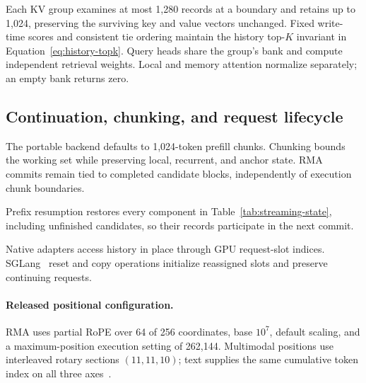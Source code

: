 Each KV group examines at most 1,280 records at a boundary and retains up to 1,024, preserving the surviving key and value vectors unchanged. Fixed write-time scores and consistent tie ordering maintain the history top-$K$ invariant in Equation~\ref{eq:history-topk}. Query heads share the group's bank and compute independent retrieval weights. Local and memory attention normalize separately; an empty bank returns zero.

\subsection{Continuation, chunking, and request lifecycle}

The portable backend defaults to 1,024-token prefill chunks. Chunking bounds the working set while preserving local, recurrent, and anchor state. RMA commits remain tied to completed candidate blocks, independently of execution chunk boundaries.

Prefix resumption restores every component in Table~\ref{tab:streaming-state}, including unfinished candidates, so their records participate in the next commit.

Native adapters access history in place through GPU request-slot indices. SGLang~\cite{sglang} reset and copy operations initialize reassigned slots and preserve continuing requests.


\paragraph{Released positional configuration.}
RMA uses partial RoPE over 64 of 256 coordinates, base $10^7$, default scaling, and a maximum-position execution setting of 262,144. Multimodal positions use interleaved rotary sections $(11,11,10)$; text supplies the same cumulative token index on all three axes~\cite{yanchorcode,yanchorconfig}.

